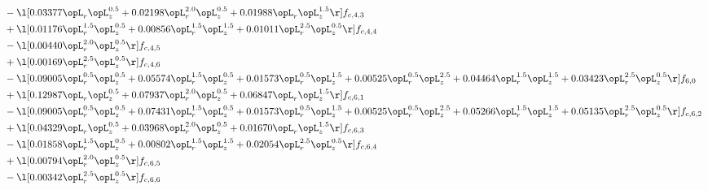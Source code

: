 \begin{alignat}{2}
& - \l[  0.03377 \opL_r \opL_z^{0.5} +  0.02198 \opL_r^{2.0} \opL_z^{0.5} +  0.01988 \opL_r \opL_z^{1.5}  \r] f_{c,4,3} \nonumber \\ 
& + \l[  0.01176 \opL_r^{1.5} \opL_z^{0.5} +  0.00856 \opL_r^{1.5} \opL_z^{1.5} +  0.01011 \opL_r^{2.5} \opL_z^{0.5}  \r] f_{c,4,4} \nonumber \\ 
& - \l[  0.00440 \opL_r^{2.0} \opL_z^{0.5}  \r] f_{c,4,5} \nonumber \\ 
& + \l[  0.00169 \opL_r^{2.5} \opL_z^{0.5}  \r] f_{c,4,6} \nonumber \\ 
& - \l[  0.09005 \opL_r^{0.5} \opL_z^{0.5} +  0.05574 \opL_r^{1.5} \opL_z^{0.5} +  0.01573 \opL_r^{0.5} \opL_z^{1.5} +  0.00525 \opL_r^{0.5} \opL_z^{2.5} +  0.04464 \opL_r^{1.5} \opL_z^{1.5} +  0.03423 \opL_r^{2.5} \opL_z^{0.5}  \r] f_{6,0} \nonumber \\ 
& + \l[  0.12987 \opL_r \opL_z^{0.5} +  0.07937 \opL_r^{2.0} \opL_z^{0.5} +  0.06847 \opL_r \opL_z^{1.5}  \r] f_{c,6,1} \nonumber \\ 
& - \l[  0.09005 \opL_r^{0.5} \opL_z^{0.5} +  0.07431 \opL_r^{1.5} \opL_z^{0.5} +  0.01573 \opL_r^{0.5} \opL_z^{1.5} +  0.00525 \opL_r^{0.5} \opL_z^{2.5} +  0.05266 \opL_r^{1.5} \opL_z^{1.5} +  0.05135 \opL_r^{2.5} \opL_z^{0.5}  \r] f_{c,6,2} \nonumber \\ 
& + \l[  0.04329 \opL_r \opL_z^{0.5} +  0.03968 \opL_r^{2.0} \opL_z^{0.5} +  0.01670 \opL_r \opL_z^{1.5}  \r] f_{c,6,3} \nonumber \\ 
& - \l[  0.01858 \opL_r^{1.5} \opL_z^{0.5} +  0.00802 \opL_r^{1.5} \opL_z^{1.5} +  0.02054 \opL_r^{2.5} \opL_z^{0.5}  \r] f_{c,6,4} \nonumber \\ 
& + \l[  0.00794 \opL_r^{2.0} \opL_z^{0.5}  \r] f_{c,6,5} \nonumber \\ 
& - \l[  0.00342 \opL_r^{2.5} \opL_z^{0.5}  \r] f_{c,6,6} \nonumber \\ 
\end{alignat} 


